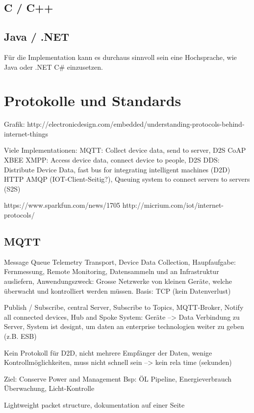 \subsection{C / C++}


\subsection{Java / .NET}
Für die Implementation kann es durchaus sinnvoll sein eine Hochsprache, wie Java oder .NET C\# einzusetzen. 

\section{Protokolle und Standards}

Grafik: http://electronicdesign.com/embedded/understanding-protocols-behind-internet-things 

Viele Implementationen:
MQTT: Collect device data, send to server, D2S
CoAP
XBEE
XMPP: Access device data, connect device to people, D2S
DDS: Distribute Device Data, fast bus for integrating intelligent machines (D2D)
HTTP
AMQP (IOT-Client-Seitig?), Queuing system to connect servers to servers (S2S)

https://www.sparkfun.com/news/1705
http://micrium.com/iot/internet-protocols/

\subsection{MQTT}
Message Queue Telemetry Transport, Device Data Collection, Haupfaufgabe: Fernmessung, Remote Monitoring, Datensammeln und an Infrastruktur ausliefern, Anwendungszweck: Grosse Netzwerke von kleinen Geräte, welche überwacht und kontrolliert werden müssen. Basis: TCP (kein Datenverlust)

Publish / Subscribe, central Server, Subscribe to Topics, MQTT-Broker, Notify all connected devices, 
Hub and Spoke System: Geräte --> Data Verbindung zu Server, System ist designt, um daten an enterprise technologien weiter zu geben (z.B. ESB)

Kein Protokoll für D2D, nicht mehrere Empfänger der Daten, wenige Kontrollmöglichkeiten, muss nicht schnell sein --> kein rela time (sekunden)

Ziel: Conserve Power and Management
Bsp: ÖL Pipeline, Energieverbrauch Überwachung, Licht-Kontrolle

Lightweight packet structure, dokumentation auf einer Seite

